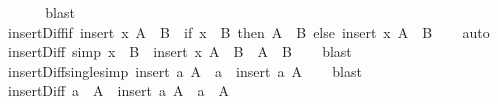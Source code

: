 \begin{isabellebody}
\ \ %
\isanewline
%
\isadelimproof
\ \ %
\endisadelimproof
%
\isatagproof
{}\isamarkupfalse%
\ blast%
\endisatagproof
{\isafoldproof}%
%
\isadelimproof
\isanewline
%
\endisadelimproof
\isanewline
{}\isamarkupfalse%
\ insert{\isacharunderscore}{\kern0pt}Diff{\isacharunderscore}{\kern0pt}if{\isacharcolon}{\kern0pt}\ {\isachardoublequoteopen}insert\ x\ A\ {\isacharminus}{\kern0pt}\ B\ {\isacharequal}{\kern0pt}\ {\isacharparenleft}{\kern0pt}if\ x\ {\isasymin}\ B\ then\ A\ {\isacharminus}{\kern0pt}\ B\ else\ insert\ x\ {\isacharparenleft}{\kern0pt}A\ {\isacharminus}{\kern0pt}\ B{\isacharparenright}{\kern0pt}{\isacharparenright}{\kern0pt}{\isachardoublequoteclose}\isanewline
%
\isadelimproof
\ \ %
\endisadelimproof
%
\isatagproof
{}\isamarkupfalse%
\ auto%
\endisatagproof
{\isafoldproof}%
%
\isadelimproof
\isanewline
%
\endisadelimproof
\isanewline
{}\isamarkupfalse%
\ insert{\isacharunderscore}{\kern0pt}Diff{}\ {\isacharbrackleft}{\kern0pt}simp{\isacharbrackright}{\kern0pt}{\isacharcolon}{\kern0pt}\ {\isachardoublequoteopen}x\ {\isasymin}\ B\ {\isasymLongrightarrow}\ insert\ x\ A\ {\isacharminus}{\kern0pt}\ B\ {\isacharequal}{\kern0pt}\ A\ {\isacharminus}{\kern0pt}\ B{\isachardoublequoteclose}\isanewline
%
\isadelimproof
\ \ %
\endisadelimproof
%
\isatagproof
{}\isamarkupfalse%
\ blast%
\endisatagproof
{\isafoldproof}%
%
\isadelimproof
\isanewline
%
\endisadelimproof
\isanewline
{}\isamarkupfalse%
\ insert{\isacharunderscore}{\kern0pt}Diff{\isacharunderscore}{\kern0pt}single{\isacharbrackleft}{\kern0pt}simp{\isacharbrackright}{\kern0pt}{\isacharcolon}{\kern0pt}\ {\isachardoublequoteopen}insert\ a\ {\isacharparenleft}{\kern0pt}A\ {\isacharminus}{\kern0pt}\ {\isacharbraceleft}{\kern0pt}a{\isacharbraceright}{\kern0pt}{\isacharparenright}{\kern0pt}\ {\isacharequal}{\kern0pt}\ insert\ a\ A{\isachardoublequoteclose}\isanewline
%
\isadelimproof
\ \ %
\endisadelimproof
%
\isatagproof
{}\isamarkupfalse%
\ blast%
\endisatagproof
{\isafoldproof}%
%
\isadelimproof
\isanewline
%
\endisadelimproof
\isanewline
{}\isamarkupfalse%
\ insert{\isacharunderscore}{\kern0pt}Diff{\isacharcolon}{\kern0pt}\ {\isachardoublequoteopen}a\ {\isasymin}\ A\ {\isasymLongrightarrow}\ insert\ a\ {\isacharparenleft}{\kern0pt}A\ {\isacharminus}{\kern0pt}\ {\isacharbraceleft}{\kern0pt}a{\isacharbraceright}{\kern0pt}{\isacharparenright}{\kern0pt}\ {\isacharequal}{\kern0pt}\ A{\isachardoublequoteclose}\isanewline

\end{isabellebody}
